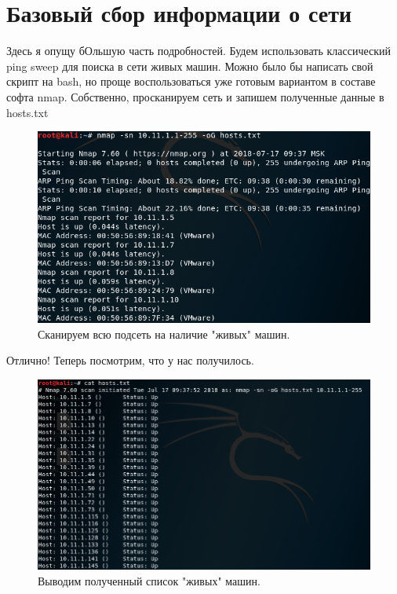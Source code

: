 \documentclass[a4paper,12pt]{article}
\begin{document}
\section{Базовый сбор информации о сети}
Здесь я опущу бОльшую часть подробностей. Будем использовать классический ping sweep для поиска в сети живых машин. Можно было бы написать свой скрипт на bash, но проще воспользоваться уже готовым вариантом в составе софта nmap. Собственно, просканируем сеть и запишем полученные данные в hosts.txt
\begin{figure}[h!]
	\includegraphics[width=\linewidth]{nmap_start_1.png}
	\caption{Сканируем всю подсеть на наличие "живых" машин.}
	\label{fig:boat1}
\end{figure}

Отлично! Теперь посмотрим, что у нас получилось. 
\newpage
\begin{figure}[h!]
	\includegraphics[width=\linewidth]{cat_hosts_2.png}
	\caption{Выводим полученный список "живых" машин.}
	\label{fig:boat2}
\end{figure}
\end{document}
